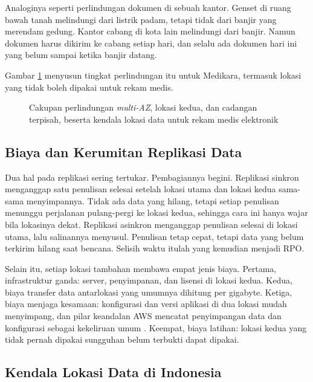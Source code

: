 Analoginya seperti perlindungan dokumen di sebuah kantor. Genset di ruang bawah tanah melindungi
dari listrik padam, tetapi tidak dari banjir yang merendam gedung. Kantor cabang di kota lain
melindungi dari banjir. Namun dokumen harus dikirim ke cabang setiap hari, dan selalu ada dokumen
hari ini yang belum sampai ketika banjir datang.

Gambar \ref{fig:ch12-cakupan} menyusun tingkat perlindungan itu untuk Medikara, termasuk lokasi yang
tidak boleh dipakai untuk rekam medis.

\begin{figure}[!htb]
  \centering
  
  \caption{Cakupan perlindungan \textit{multi-AZ}, lokasi kedua, dan cadangan terpisah, beserta
           kendala lokasi data untuk rekam medis elektronik}
  \label{fig:ch12-cakupan}
\end{figure}

\subsection{Biaya dan Kerumitan Replikasi Data}

Dua hal pada replikasi sering tertukar. Pembagiannya begini. Replikasi sinkron menganggap satu
penulisan selesai setelah lokasi utama dan lokasi kedua sama-sama menyimpannya. Tidak ada data yang
hilang, tetapi setiap penulisan menunggu perjalanan pulang-pergi ke lokasi kedua, sehingga cara ini
hanya wajar bila lokasinya dekat. Replikasi asinkron menganggap penulisan selesai di lokasi utama,
lalu salinannya menyusul. Penulisan tetap cepat, tetapi data yang belum terkirim hilang saat
bencana. Selisih waktu itulah yang kemudian menjadi RPO.

Selain itu, setiap lokasi tambahan membawa empat jenis biaya. Pertama, infrastruktur ganda: server,
penyimpanan, dan lisensi di lokasi kedua. Kedua, biaya transfer data antarlokasi yang umumnya
dihitung per gigabyte. Ketiga, biaya menjaga kesamaan: konfigurasi dan versi aplikasi di dua lokasi
mudah menyimpang, dan pilar keandalan AWS mencatat penyimpangan data dan konfigurasi sebagai
kekeliruan umum \cite{c12-aws-rel10}. Keempat, biaya latihan: lokasi kedua yang tidak pernah dipakai
sungguhan belum terbukti dapat dipakai.

\subsection{Kendala Lokasi Data di Indonesia}

